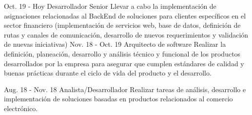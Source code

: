 \documentclass[]{cv-class}
\begin{document}
\begin{entrylist}
	\entry
	{Oct. 19 - Hoy}
	{Desarrollador Senior}
	{ }
	{Llevar a cabo la implementación de asignaciones relacionadas al BackEnd de soluciones para clientes específicos en el sector financiero (implementación de servicios web, base de datos, definición de rutas y canales de comunicación, desarrollo de nuevos requerimientos y validación de nuevas iniciativas)}
	\entry
	{Nov. 18 - Oct. 19}
	{Arquitecto de software}
	{ }
	{Realizar la definición, planeación, desarrollo y análisis técnico y funcional de los productos desarrollados por la empresa para asegurar que cumplen estándares de calidad y buenas prácticas durante el ciclo de vida del producto y el desarrollo.}
	    
	\entry
	{Aug. 18 - Nov. 18}
	{Analista/Desarrollador}
	{ }
	{Realizar tareas de análisis, desarrollo e implementación de soluciones basadas en productos relacionados al comercio electrónico.}
	

\end{entrylist}
\end{document}
